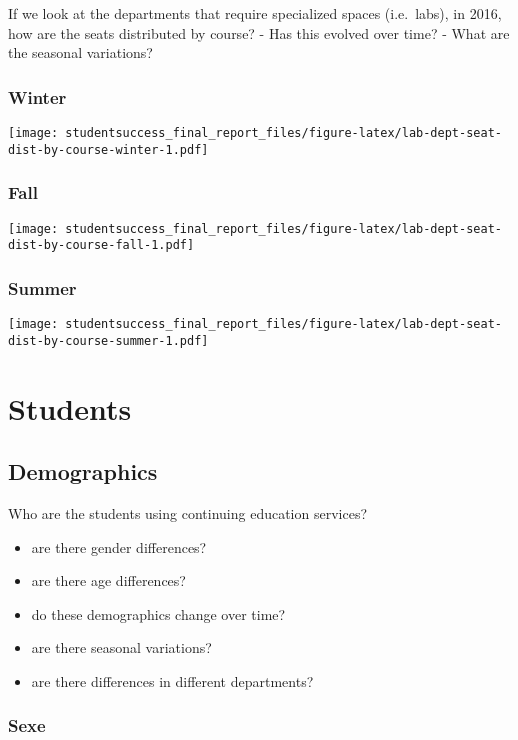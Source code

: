 \documentclass[]{book}
\providecommand{\tightlist}{%
  \setlength{\itemsep}{0pt}\setlength{\parskip}{0pt}}
\theoremstyle{definition}
\theoremstyle{definition}
\theoremstyle{remark}
\begin{document}
If we look at the departments that require specialized spaces
(i.e.~labs), in 2016, how are the seats distributed by course? - Has
this evolved over time? - What are the seasonal variations?

\subsubsection{Winter}\label{winter}

\texttt{[image: studentsuccess\_final\_report\_files/figure-latex/lab-dept-seat-dist-by-course-winter-1.pdf]}

\subsubsection{Fall}\label{fall}

\texttt{[image: studentsuccess\_final\_report\_files/figure-latex/lab-dept-seat-dist-by-course-fall-1.pdf]}

\subsubsection{Summer}\label{summer}

\texttt{[image: studentsuccess\_final\_report\_files/figure-latex/lab-dept-seat-dist-by-course-summer-1.pdf]}

\section{Students}\label{students}

\subsection{Demographics}\label{demographics}

Who are the students using continuing education services?

\begin{itemize}
\tightlist
\item
  are there gender differences?
\item
  are there age differences?
\item
  do these demographics change over time?
\item
  are there seasonal variations?
\item
  are there differences in different departments?
\end{itemize}

\subsubsection{Sexe}\label{sexe}
\end{document}
